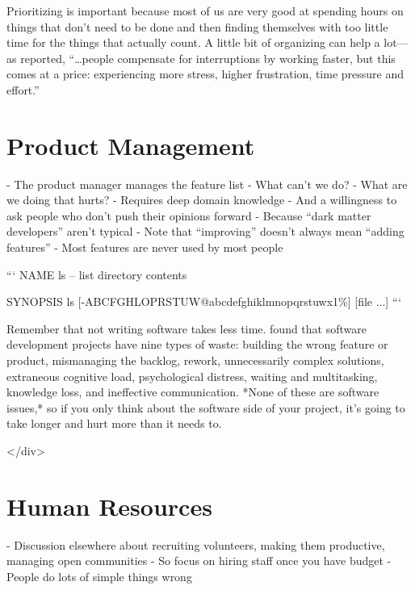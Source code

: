 \documentclass[10pt,letterpaper]{article}
\begin{document}
Prioritizing is important because most of us are very good at spending
hours on things that don't need to be done and then finding themselves
with too little time for the things that actually count. A little bit
of organizing can help a lot---as \cite{Mark2008} reported,
``{\ldots}people compensate for interruptions by working faster, but
this comes at a price: experiencing more stress, higher frustration,
time pressure and effort.''

\section{Product Management}

- The product manager manages the feature list
  - What can't we do?
  - What are we doing that hurts?
- Requires deep domain knowledge
  - And a willingness to ask people who don't push their opinions forward
  - Because ``dark matter developers'' aren't typical \cite{Hanselman2012}
- Note that ``improving'' doesn't always mean ``adding features'' \cite{Perri2018}
  - Most features are never used by most people \cite{Xu2015}

```
NAME
     ls -- list directory contents

SYNOPSIS
     ls [-ABCFGHLOPRSTUW@abcdefghiklmnopqrstuwx1\%] [file ...]
```

Remember that not writing software takes less time.  \cite{Sedano2017}
found that software development projects have nine types of waste:
building the wrong feature or product, mismanaging the backlog,
rework, unnecessarily complex solutions, extraneous cognitive load,
psychological distress, waiting and multitasking, knowledge loss, and
ineffective communication.  *None of these are software issues,* so if
you only think about the software side of your project, it's going to
take longer and hurt more than it needs to.

</div>

\section{Human Resources}

- Discussion elsewhere about recruiting volunteers, making them productive, managing open communities \cite{Sholler2019}
  - So focus on hiring staff once you have budget
- People do lots of simple things wrong \cite{Behroozi2020}
\end{document}
